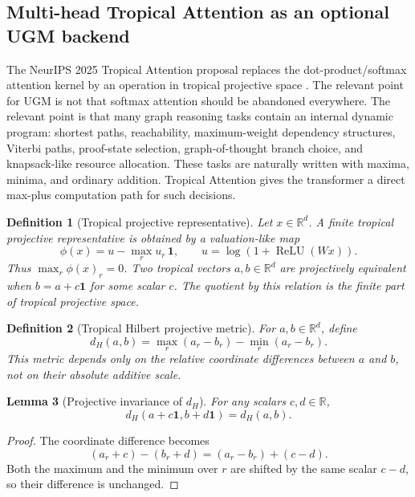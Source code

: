 \documentclass[11pt]{article}
\newtheorem{definition}{Definition}[section]
\newtheorem{lemma}[definition]{Lemma}
\newcommand{\R}{\mathbb{R}}
\newcommand{\1}{\mathbf{1}}
\begin{document}
\subsection{Multi-head Tropical Attention as an optional UGM backend}

The NeurIPS 2025 Tropical Attention proposal replaces the dot-product/softmax attention kernel by an operation in tropical projective space \cite{HashemiTropicalAttention2025}. The relevant point for UGM is not that softmax attention should be abandoned everywhere. The relevant point is that many graph reasoning tasks contain an internal dynamic program: shortest paths, reachability, maximum-weight dependency structures, Viterbi paths, proof-state selection, graph-of-thought branch choice, and knapsack-like resource allocation. These tasks are naturally written with maxima, minima, and ordinary addition. Tropical Attention gives the transformer a direct max-plus computation path for such decisions.

\begin{definition}[Tropical projective representative]
Let \(x\in\R^d\). A finite tropical projective representative is obtained by a valuation-like map
\[
  \phi(x)=u-\max_r u_r\,\1,\qquad
  u=\log(1+\operatorname{ReLU}(Wx)).
\]
Thus \(\max_r \phi(x)_r=0\). Two tropical vectors \(a,b\in\R^d\) are projectively equivalent when \(b=a+c\1\) for some scalar \(c\). The quotient by this relation is the finite part of tropical projective space.
\end{definition}

\begin{definition}[Tropical Hilbert projective metric]
For \(a,b\in\R^d\), define
\[
  d_H(a,b)=\max_r(a_r-b_r)-\min_r(a_r-b_r).
\]
This metric depends only on the relative coordinate differences between \(a\) and \(b\), not on their absolute additive scale.
\end{definition}

\begin{lemma}[Projective invariance of \(d_H\)]
For any scalars \(c,d\in\R\),
\[
  d_H(a+c\1,b+d\1)=d_H(a,b).
\]
\end{lemma}
\begin{proof}
The coordinate difference becomes
\[
(a_r+c)-(b_r+d)=(a_r-b_r)+(c-d).
\]
Both the maximum and the minimum over \(r\) are shifted by the same scalar \(c-d\), so their difference is unchanged.
\end{proof}
\end{document}
